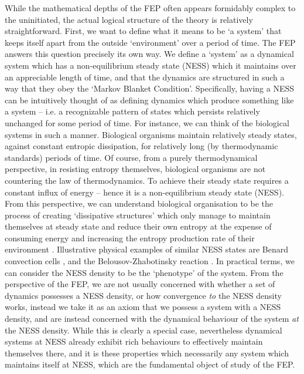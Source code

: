 While the mathematical depths of the FEP often appears formidably complex to the uninitiated, the actual logical structure of the theory is relatively straightforward. First, we want to define what it means to be `a system' that keeps itself apart from the outside `environment' over a period of time. The FEP answers this question precisely its own way. We define a `system' as a dynamical system which has a non-equilibrium steady state (NESS) which it maintains over an appreciable length of time, and that the dynamics are structured in such a way that they obey the `Markov Blanket Condition'. Specifically, having a NESS can be intuitively thought of as defining dynamics which produce something like a system -- i.e. a recognizable pattern of states which persists relatively unchanged for some period of time. For instance, we can think of the biological systems in such a manner. Biological organisms maintain relatively steady states, against constant entropic dissipation, for relatively long (by thermodynamic standards) periods of time. Of course, from a purely thermodynamical perspective, in resisting entropy themselves, biological organisms are not countering the law of thermodynamics. To achieve their steady state requires a constant influx of energy -- hence it is a non-equilibrium steady state (NESS). From this perspective, we can understand biological organisation to be the process of creating `dissipative structures' \citep{prigogine1973theory, kondepudi2014modern} which only manage to maintain themselves at steady state and reduce their own entropy at the expense of consuming energy and increasing the entropy production rate of their environment \citep{prigogine2017non}. Illustrative physical examples of similar NESS states are Benard convection cells , and the Belousov-Zhabotinsky reaction \citep{zwanzig2001nonequilibrium}. In practical terms, we can consider the NESS density to be the `phenotype' of the system. From the perspective of the FEP, we are not usually concerned with whether a set of dynamics possesses a NESS density, or how convergence \emph{to} the NESS density works, instead we take it as an axiom that we possess a system with a NESS density, and are instead concerned with the dynamical behaviour of the system \emph{at} the NESS density. While this is clearly a special case, nevertheless dynamical systems at NESS already exhibit rich behaviours to effectively maintain themselves there, and it is these properties which necessarily any system which maintains itself at NESS, which are the fundamental object of study of the FEP. 

